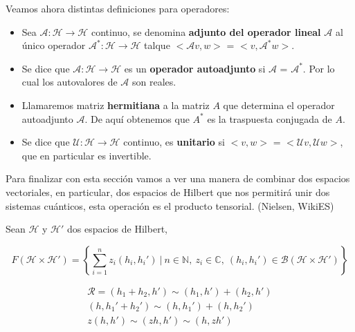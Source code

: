 \newpage

Veamos ahora distintas definiciones para operadores:
\begin{itemize}
    \item Sea $\mathscr{A}:\mathscr{H} \rightarrow \mathscr{H}$ continuo, se denomina \textbf{adjunto del operador lineal} $\mathscr{A}$ al único operador   $\mathscr{A}^{*}:\mathscr{H} \rightarrow \mathscr{H}$ talque $<\mathscr{A}v,w>$ = $<v,\mathscr{A}^{*}w>$.
    \item Se dice que $\mathscr{A}:\mathscr{H} \rightarrow \mathscr{H}$ es un \textbf{operador autoadjunto} si $\mathscr{A}$ = $\mathscr{A}^{*}$. Por lo cual los autovalores de $\mathscr{A}$ son reales.
    \item Llamaremos matriz \textbf{hermitiana} a la matriz $A$ que determina el operador autoadjunto $\mathscr{A}$. De aquí obtenemos que $A^{*}$ es la traspuesta conjugada de $A$.
    \item Se dice que $\mathscr{U}:\mathscr{H} \rightarrow \mathscr{H}$  continuo, es \textbf{unitario} si $<v,w>$ = $<\mathscr{U}v,\mathscr{U}w>$, que en particular es invertible.
\end{itemize}

\vspace{5pt}

Para finalizar con esta sección vamos a ver una manera de combinar dos espacios vectoriales, en particular, dos espacios de Hilbert que nos permitirá unir dos sistemas cuánticos, esta operación es el producto tensorial. (Nielsen, WikiES)

\vspace{10pt}

Sean $\mathscr{H}$ y $\mathscr{H}'$ dos espacios de Hilbert,

\vspace{5pt}
\begin{equation*}
    F(\mathscr{H} \times \mathscr{H}') = \left\lbrace \sum_{i=1}^{n}z_{i} (h_{i},h_{i}')\:|\:n \in \mathbb{N},\: z_{i} \in \mathbb{C},\:(h_{i},h_{i}') \in \mathscr{B}(\mathscr{H} \times \mathscr{H}') \right\rbrace
\end{equation*}

\vspace{5pt}
\begin{equation*}
\begin{split}
    \mathscr{R} =  (h_{1}+h_{2},h') \sim (h_{1},h') + (h_{2},h') \\ 
    (h,h_{1}'+h_{2}') \sim (h,h_{1}') + (h,h_{2}') \\
    z(h,h') \sim (z h,h') \sim (h,z h')
\end{split}
\end{equation*}

